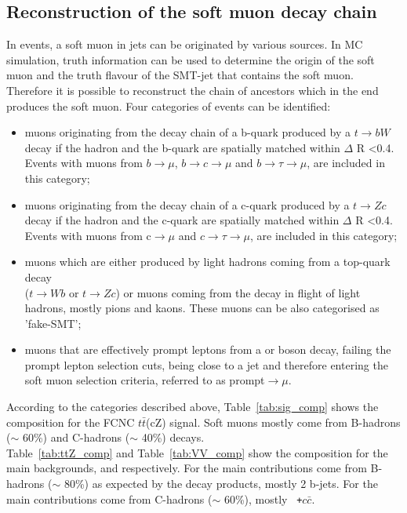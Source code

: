 \subsection {Reconstruction of the soft muon decay chain}
\label{sec:smt_compositions}
In \ttbar events, a soft muon in jets can be originated by various sources. In MC simulation, truth information can be used to determine the origin of the soft muon and the truth flavour of the SMT-jet that contains the soft muon. Therefore it is possible to reconstruct the chain of ancestors which in the end produces the soft muon. 
Four categories of events can be identified:
\begin{itemize}
	\item muons originating from the decay chain of a b-quark produced by a $t\rightarrow bW$ decay if the hadron and the b-quark are spatially matched within $\Delta$ R <0.4. Events with muons from $b\rightarrow \mu$, $b\rightarrow c\rightarrow \mu$ and $b\rightarrow \tau \rightarrow \mu$, are included in this category;
	\item muons originating from the decay chain of a c-quark produced by a $t\rightarrow Zc$ decay if the hadron and the c-quark are spatially matched within $\Delta$ R <0.4. Events with muons from c$\rightarrow \mu$ and $c\rightarrow \tau \rightarrow \mu$, are included in this category;
	\item muons which are either produced by light hadrons coming from a top-quark decay\\ ($t\rightarrow Wb$ or $t\rightarrow Zc$) or muons coming from the decay in flight of light hadrons, mostly pions and kaons. These muons can be also categorised as 'fake-SMT';
	\item muons that are effectively prompt leptons from a \PW or \PZ boson decay, failing the prompt lepton selection cuts, being close to a jet and therefore entering the soft muon selection criteria, referred to as prompt$\rightarrow \mu$.
\end{itemize}
According to the categories described above, Table~\ref{tab:sig_comp} shows the composition for the FCNC $t\bar{t}$(cZ) signal. Soft muons mostly come from B-hadrons ($\sim$ 60\%)  and C-hadrons ($\sim$ 40\%) decays.\\
Table~\ref{tab:ttZ_comp} and Table~\ref{tab:VV_comp} show the composition for the main backgrounds, \ttZ and \VVHF respectively. 
For \ttZ the main contributions come from B-hadrons ($\sim$ 80\%) as expected by the \ttZ decay products, mostly 2 b-jets.
For \VVHF the main contributions come from C-hadrons ($\sim$ 60\%), mostly  \WZ~\texttt{+$c\bar{c}$}.


